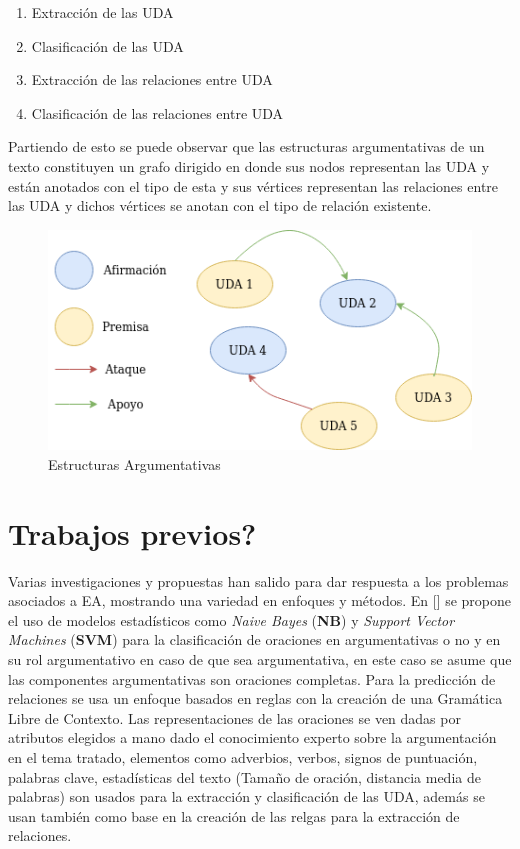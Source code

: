 \begin{enumerate}
    \item Extracción de las UDA
    \item Clasificación de las UDA
    \item Extracción de las relaciones entre UDA
    \item Clasificación de las relaciones entre UDA
\end{enumerate}

Partiendo de esto se puede observar que las estructuras argumentativas de un texto constituyen un grafo dirigido 
en donde sus nodos representan las UDA y están anotados con el tipo de esta y sus vértices representan las 
relaciones entre las UDA y dichos vértices se anotan con el tipo de relación existente.

\begin{figure}[h!]
	\begin{center}
		\begin{center}
			\includegraphics[scale=.3]{Graphics/Estructuras_argumentativas.png}
        \end{center}
	    \caption{Estructuras Argumentativas}\label{fig:arg_struct}
	\end{center}
\end{figure}

\section{Trabajos previos?}

Varias investigaciones y propuestas han salido para dar respuesta a los problemas asociados a EA, mostrando
una variedad en enfoques y métodos.
En [\cite{palau2009argumentation}] se propone
el uso de modelos estadísticos como \emph{Naive Bayes} (\textbf{NB}) y \emph{Support Vector Machines} (\textbf{SVM}) 
para la clasificación de 
oraciones en argumentativas o no y en su rol argumentativo en caso de que sea argumentativa, en este
caso se asume que las componentes argumentativas son oraciones completas. Para la predicción de relaciones
se usa un enfoque basados en reglas con la creación de una Gramática Libre de Contexto. Las representaciones
de las oraciones se ven dadas por atributos elegidos a mano dado el conocimiento experto sobre la argumentación
en el tema tratado, elementos como adverbios, verbos, signos de puntuación, palabras clave, estadísticas del texto
(Tamaño de oración, distancia media de palabras) son usados para la extracción y clasificación de las UDA, además
se usan también como base en la creación de las relgas para la extracción de relaciones.

